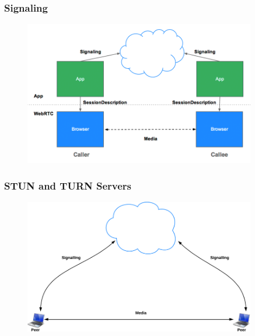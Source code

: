 \documentclass{beamer}
\begin{document}
\begin{frame}[c]\frametitle{Signaling}

\begin{figure}
\centering
\includegraphics[width=0.9\textwidth]{images/jsep}
\end{figure}

\end{frame}


\begin{frame}[t]\frametitle{STUN and TURN Servers}
\begin{figure}
\centering
\includegraphics[keepaspectratio=true, width=0.9\textwidth]{images/noSTUNorTURN}
\end{figure}
\end{frame}
\end{document}
